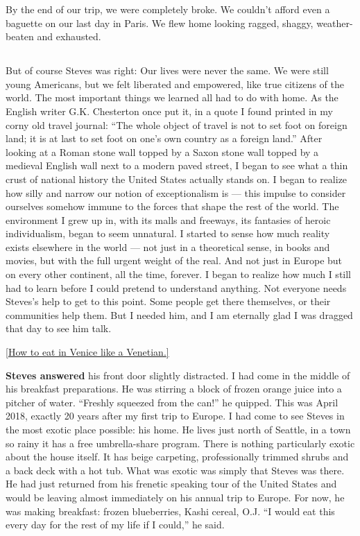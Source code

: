 By the end of our trip, we were completely broke. We couldn't afford
even a baguette on our last day in Paris. We flew home looking ragged,
shaggy, weather-beaten and exhausted.

\hypertarget{-5}{%
\subsection{}\label{-5}}

But of course Steves was right: Our lives were never the same. We were
still young Americans, but we felt liberated and empowered, like true
citizens of the world. The most important things we learned all had to
do with home. As the English writer G.K. Chesterton once put it, in a
quote I found printed in my corny old travel journal: ``The whole object
of travel is not to set foot on foreign land; it is at last to set foot
on one's own country as a foreign land.'' After looking at a Roman stone
wall topped by a Saxon stone wall topped by a medieval English wall next
to a modern paved street, I began to see what a thin crust of national
history the United States actually stands on. I began to realize how
silly and narrow our notion of exceptionalism is --- this impulse to
consider ourselves somehow immune to the forces that shape the rest of
the world. The environment I grew up in, with its malls and freeways,
its fantasies of heroic individualism, began to seem unnatural. I
started to sense how much reality exists elsewhere in the world --- not
just in a theoretical sense, in books and movies, but with the full
urgent weight of the real. And not just in Europe but on every other
continent, all the time, forever. I began to realize how much I still
had to learn before I could pretend to understand anything. Not everyone
needs Steves's help to get to this point. Some people get there
themselves, or their communities help them. But I needed him, and I am
eternally glad I was dragged that day to see him talk.

\href{https://www.nytimes3xbfgragh.onion/2019/02/27/travel/venice-cicchetti-small-plates.html}{{[}How
to eat in Venice like a Venetian.{]}}

\textbf{Steves answered} his front door slightly distracted. I had come
in the middle of his breakfast preparations. He was stirring a block of
frozen orange juice into a pitcher of water. ``Freshly squeezed from the
can!'' he quipped. This was April 2018, exactly 20 years after my first
trip to Europe. I had come to see Steves in the most exotic place
possible: his home. He lives just north of Seattle, in a town so rainy
it has a free umbrella-share program. There is nothing particularly
exotic about the house itself. It has beige carpeting, professionally
trimmed shrubs and a back deck with a hot tub. What was exotic was
simply that Steves was there. He had just returned from his frenetic
speaking tour of the United States and would be leaving almost
immediately on his annual trip to Europe. For now, he was making
breakfast: frozen blueberries, Kashi cereal, O.J. ``I would eat this
every day for the rest of my life if I could,'' he said.

